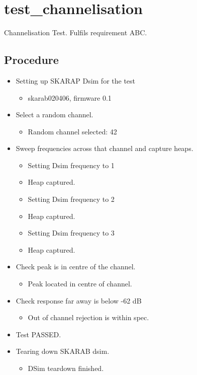 \documentclass{article}%
\begin{document}
%
\normalsize%
\section{test\_channelisation}%
\label{sec:testchannelisation}%
Channelisation Test.\newline%
\newline%
    Fulfils requirement ABC.\newline%
\subsection{Procedure}%
\label{subsec:Procedure}%
\begin{itemize}%
\item%
Setting up SKARAP Dsim for the test%
\begin{itemize}%
\item%
skarab020406, firmware 0.1%
\end{itemize}%
\item%
Select a random channel.%
\begin{itemize}%
\item%
Random channel selected: 42%
\end{itemize}%
\item%
Sweep frequencies across that channel and capture heaps.%
\begin{itemize}%
\item%
Setting Dsim frequency to 1%
\item%
Heap captured.%
\item%
Setting Dsim frequency to 2%
\item%
Heap captured.%
\item%
Setting Dsim frequency to 3%
\item%
Heap captured.%
\end{itemize}%
\item%
Check peak is in centre of the channel.%
\begin{itemize}%
\item%
Peak located in centre of channel.%
\end{itemize}%
\item%
Check response far away is below {-}62 dB%
\begin{itemize}%
\item%
Out of channel rejection is within spec.%
\end{itemize}%
\item%
Test PASSED.%
%
\item%
Tearing down SKARAB dsim.%
\begin{itemize}%
\item%
DSim teardown finished.%
\end{itemize}%
\end{itemize}
\end{document}
